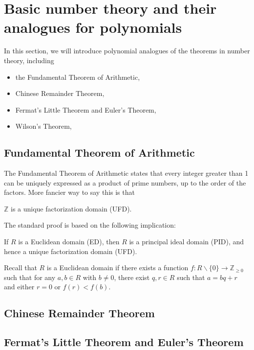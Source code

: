 \section{Basic number theory and their analogues for polynomials}
\label{sec:basicnt}

In this section, we will introduce polynomial analogues of the theorems in number theory, including
\begin{itemize}
    \item the Fundamental Theorem of Arithmetic,
    \item Chinese Remainder Theorem,
    \item Fermat's Little Theorem and Euler's Theorem,
    \item Wilson's Theorem,
\end{itemize}


\subsection{Fundamental Theorem of Arithmetic}
\label{subsec:basicnt_fta}

The Fundamental Theorem of Arithmetic states that every integer greater than 1 can be uniquely expressed as a product of prime numbers, up to the order of the factors.
More fancier way to say this is that

\begin{theorem}
    $\mathbb{Z}$ is a unique factorization domain (UFD).
\end{theorem}
The standard proof is based on the following implication:
\begin{theorem}
    If $R$ is a Euclidean domain (ED), then $R$ is a principal ideal domain (PID), and hence a unique factorization domain (UFD).
\end{theorem}
Recall that $R$ is a Euclidean domain if there exists a function $f : R \backslash \{0\} \to \mathbb{Z}_{\geq 0}$ such that for any $a, b \in R$ with $b \neq 0$, there exist $q, r \in R$ such that $a = bq + r$ and either $r = 0$ or $f(r) < f(b)$.


\subsection{Chinese Remainder Theorem}
\label{subsec:basicnt_crt}


\subsection{Fermat's Little Theorem and Euler's Theorem}
\label{subsec:basicnt_flittlet}

